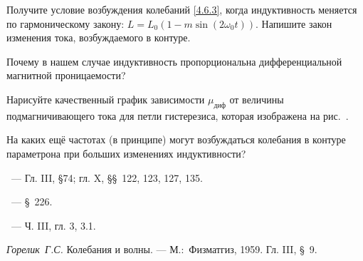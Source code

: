 \begin{lab:questions}
\item
Получите условие возбуждения колебаний \eqref{4.6.3}, когда индуктивность
меняется по гармоническому закону: $L = L_0(1-m\sin(2\omega_0t))$. Напишите закон
изменения тока, возбуждаемого в контуре.

\item
Почему в нашем случае индуктивность пропорциональна дифференциальной магнитной
проницаемости?

\item
Нарисуйте качественный график зависимости $\mu_\text{диф}$ от величины
подмагничивающего тока для петли гистерезиса, которая изображена на
рис.~.

\item
На каких ещё частотах (в принципе) могут возбуждаться колебания в контуре
параметрона при больших изменениях индуктивности?
\end{lab:questions}


\begin{lab:literature}
\item
\SivuhinIII~--- Гл. III, \S 74; гл. X, \S\S~122, 123, 127, 135.

\item
\Kalashnikov~--- \S~226.

\item
\KingLokOlh~--- Ч. III, гл. 3, 3.1.

\item
\textit{Горелик~Г.С.} Колебания и волны. --- М.:~Физматгиз, 1959. Гл. III, \S~9.

\end{lab:literature}
